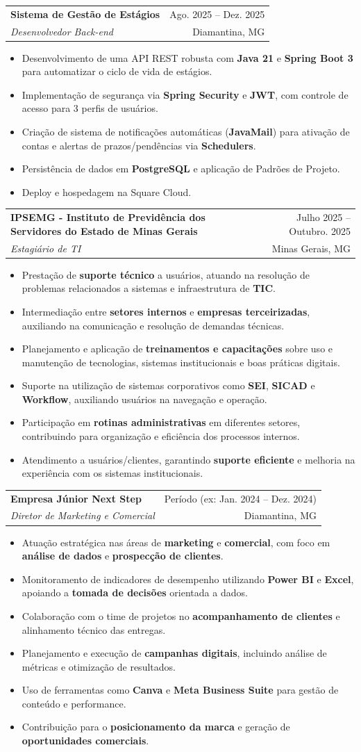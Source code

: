\documentclass[letterpaper,11pt]{article}
\makeatletter
\newcommand{\resumeItem}[1]{
  \item\small{
    {#1 \vspace{-1pt}}
  }
}
\newcommand{\resumeSubheading}[4]{
  \vspace{-1pt}\item
    \begin{tabular*}{\textwidth}[t]{l@{\extracolsep{\fill}}r}
      \textbf{#1} & {\color{dark-grey}\small #2}\vspace{1pt}\\ %
      \textit{#3} & {\color{dark-grey} \small #4}\\ %
    \end{tabular*}\vspace{-4pt}
}
\newcommand{\resumeItemListStart}{\begin{itemize}}
\newcommand{\resumeItemListEnd}{\end{itemize}\vspace{0pt}}
\makeatother
\begin{document}
    \resumeSubheading
      {Sistema de Gestão de Estágios}{Ago. 2025 -- Dez. 2025}
      {Desenvolvedor Back-end}{Diamantina, MG}
      \resumeItemListStart
        \resumeItem{Desenvolvimento de uma API REST robusta com \textbf{Java 21} e \textbf{Spring Boot 3} para automatizar o ciclo de vida de estágios.}
        \resumeItem{Implementação de segurança via \textbf{Spring Security} e \textbf{JWT}, com controle de acesso para 3 perfis de usuários.}
         \resumeItem{Criação de sistema de notificações automáticas (\textbf{JavaMail}) para ativação de contas e alertas de prazos/pendências via \textbf{Schedulers}.}
        \resumeItem{Persistência de dados em \textbf{PostgreSQL} e aplicação de Padrões de Projeto.}
        \resumeItem{Deploy e hospedagem na Square Cloud.}
      \resumeItemListEnd

      \resumeSubheading
  {IPSEMG - Instituto de Previdência dos Servidores do Estado de Minas Gerais}{Julho 2025 -- Outubro. 2025}
  {Estagiário de TI}{Minas Gerais, MG}
  \resumeItemListStart
    \resumeItem{Prestação de \textbf{suporte técnico} a usuários, atuando na resolução de problemas relacionados a sistemas e infraestrutura de \textbf{TIC}.}
    \resumeItem{Intermediação entre \textbf{setores internos} e \textbf{empresas terceirizadas}, auxiliando na comunicação e resolução de demandas técnicas.}
    \resumeItem{Planejamento e aplicação de \textbf{treinamentos e capacitações} sobre uso e manutenção de tecnologias, sistemas institucionais e boas práticas digitais.}
    \resumeItem{Suporte na utilização de sistemas corporativos como \textbf{SEI}, \textbf{SICAD} e \textbf{Workflow}, auxiliando usuários na navegação e operação.}
    \resumeItem{Participação em \textbf{rotinas administrativas} em diferentes setores, contribuindo para organização e eficiência dos processos internos.}
    \resumeItem{Atendimento a usuários/clientes, garantindo \textbf{suporte eficiente} e melhoria na experiência com os sistemas institucionais.}
  \resumeItemListEnd

  \resumeSubheading
  {Empresa Júnior Next Step}{Período (ex: Jan. 2024 -- Dez. 2024)}
  {Diretor de Marketing e Comercial}{Diamantina, MG}
  \resumeItemListStart
    \resumeItem{Atuação estratégica nas áreas de \textbf{marketing} e \textbf{comercial}, com foco em \textbf{análise de dados} e \textbf{prospecção de clientes}.}
    \resumeItem{Monitoramento de indicadores de desempenho utilizando \textbf{Power BI} e \textbf{Excel}, apoiando a \textbf{tomada de decisões} orientada a dados.}
    \resumeItem{Colaboração com o time de projetos no \textbf{acompanhamento de clientes} e alinhamento técnico das entregas.}
    \resumeItem{Planejamento e execução de \textbf{campanhas digitais}, incluindo análise de métricas e otimização de resultados.}
    \resumeItem{Uso de ferramentas como \textbf{Canva} e \textbf{Meta Business Suite} para gestão de conteúdo e performance.}
    \resumeItem{Contribuição para o \textbf{posicionamento da marca} e geração de \textbf{oportunidades comerciais}.}
  \resumeItemListEnd
\end{document}
